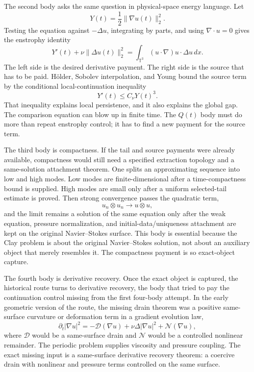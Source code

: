 The second body asks the same question in physical-space energy language.
Let
\[
  Y(t)=\frac12\|\nabla u(t)\|_2^2 .
\]
Testing the equation against \(-\Delta u\), integrating by parts, and using
\(\nabla\cdot u=0\) gives the enstrophy identity
\[
  Y'(t)+\nu\|\Delta u(t)\|_2^2
    = \int_{\mathbb T^3}(u\cdot\nabla)u\cdot\Delta u\,dx .
\]
The left side is the desired derivative payment.
The right side is the source that has to be paid.
H\"older, Sobolev interpolation, and Young bound the source term by the
conditional local-continuation inequality
\[
  Y'(t)\le C_\nu Y(t)^3 .
\]
That inequality explains local persistence, and it also explains the global
gap.
The comparison equation can blow up in finite time.
The \(Q(t)\) body must do more than repeat enstrophy control; it has to find a
new payment for the source term.

The third body is compactness.
If the tail and source payments were already available, compactness would still
need a specified extraction topology and a same-solution attachment theorem.
One splits an approximating sequence into low and high modes.
Low modes are finite-dimensional after a time-compactness bound is supplied.
High modes are small only after a uniform selected-tail estimate is proved.
Then strong convergence passes the quadratic term,
\[
  u_n\otimes u_n\longrightarrow u\otimes u,
\]
and the limit remains a solution of the same equation only after the weak
equation, pressure normalization, and initial-data/uniqueness attachment are
kept on the original Navier--Stokes surface.
This body is essential because the Clay problem is about the original
Navier--Stokes solution, not about an auxiliary object that merely resembles
it.
The compactness payment is so exact-object capture.

The fourth body is derivative recovery.
Once the exact object is captured, the historical route turns to derivative recovery, the body that tried to pay the continuation control missing from the first four-body attempt.
In the early geometric version of the route, the missing drain theorem was a
positive same-surface curvature or deformation term in a gradient evolution law,
\[
  \partial_t|\nabla u|^2
    = -\mathcal D(\nabla u) + \nu\Delta |\nabla u|^2
      + \mathcal N(\nabla u),
\]
where \(\mathcal D\) would be a same-surface drain and \(\mathcal N\) would be a
controlled nonlinear remainder.
The periodic problem supplies viscosity and pressure coupling.
The exact missing input is a same-surface derivative recovery theorem: a
coercive drain with nonlinear and pressure terms controlled on the same
surface.

